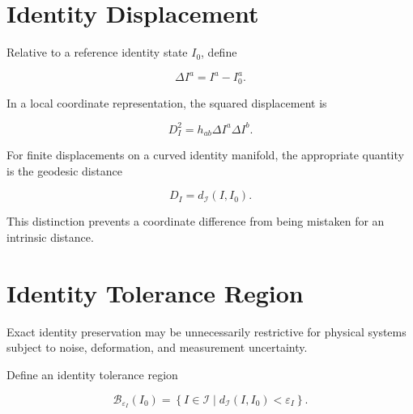 \documentclass[12pt,oneside]{book}
\begin{document}

\section{Identity Displacement}
\label{sec:identity-displacement}

Relative to a reference identity state \(I_0\), define

\begin{equation}
    \Delta I^a
    =
    I^a
    -
    I_0^a.
    \label{eq:identity-displacement-vector}
\end{equation}

In a local coordinate representation, the squared displacement
is

\begin{equation}
    D_I^2
    =
    h_{ab}
    \Delta I^a
    \Delta I^b.
    \label{eq:identity-displacement-squared}
\end{equation}

For finite displacements on a curved identity manifold, the
appropriate quantity is the geodesic distance

\begin{equation}
    D_I
    =
    d_{\mathcal{I}}(I,I_0).
    \label{eq:identity-geodesic-distance}
\end{equation}

This distinction prevents a coordinate difference from being
mistaken for an intrinsic distance.


\section{Identity Tolerance Region}
\label{sec:identity-tolerance-region}

Exact identity preservation may be unnecessarily restrictive for
physical systems subject to noise, deformation, and measurement
uncertainty.

Define an identity tolerance region

\begin{equation}
    \mathcal{B}_{\varepsilon_I}(I_0)
    =
    \left\{
        I\in\mathcal{I}
        \mid
        d_{\mathcal{I}}(I,I_0)
        <
        \varepsilon_I
    \right\}.
    \label{eq:identity-tolerance-ball}
\end{equation}
\end{document}
